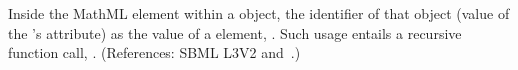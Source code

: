 Inside the  MathML element within a \FunctionDefinition
object,  the identifier of that object (\ie value of the
\FunctionDefinition's  attribute)  as the value of a
 element, .  Such usage entails a recursive function call, .  (References: SBML L3V2
 and~.)

